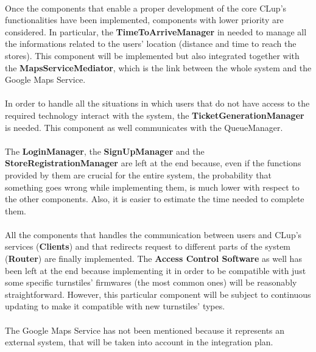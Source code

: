 \documentclass{article}
\begin{document}
\smallskip\\
Once the components that enable a proper development of the core CLup’s functionalities have been implemented, components with lower priority are considered. In particular, the \textbf{TimeToArriveManager} in needed to manage all the informations related to the users’ location (distance and time to reach the stores). This component will be implemented but also integrated together with the \textbf{MapsServiceMediator}, which is the link between the whole system and the Google Maps Service.\\
\smallskip\\
In order to handle all the situations in which users that do not have access to the required technology interact with the system, the \textbf{TicketGenerationManager} is needed. This component as well communicates with the QueueManager.\\
\smallskip\\
The \textbf{LoginManager}, the \textbf{SignUpManager} and the \textbf{StoreRegistrationManager} are left at the end because, even if the functions provided by them are crucial for the entire system, the probability that something goes wrong while implementing them, is much lower with respect to the other components. Also, it is easier to estimate the time needed to complete them.\\
\smallskip\\
All the components that handles the communication between users and CLup’s services (\textbf{Clients}) and that redirects request to different parts of the system (\textbf{Router}) are finally implemented. The \textbf{Access Control Software} as well has been left at the end because implementing it in order to be compatible with just some specific turnstiles’  firmwares (the most common ones) will be reasonably straightforward. However, this particular component will be subject to continuous updating to make it compatible with new turnstiles’ types.\\
\smallskip\\
The Google Maps Service has not been mentioned because it represents an external system, that will be taken into account in the integration plan.
\end{document}
